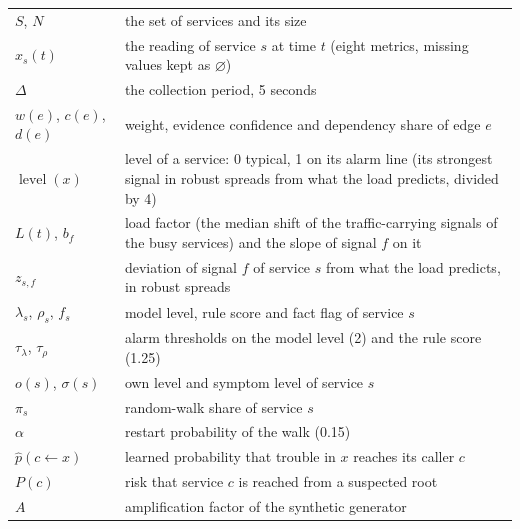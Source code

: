 \begin{tabular}{@{}p{3.2cm}p{11cm}@{}}
$S$, $N$ & the set of services and its size\\
$x_s(t)$ & the reading of service $s$ at time $t$ (eight metrics, missing values kept as $\varnothing$)\\
$\Delta$ & the collection period, 5 seconds\\
$w(e)$, $c(e)$, $d(e)$ & weight, evidence confidence and dependency share of edge $e$\\
$\operatorname{level}(x)$ & level of a service: 0 typical, 1 on its alarm line (its strongest signal in robust spreads from what the load predicts, divided by 4)\\
$L(t)$, $b_f$ & load factor (the median shift of the traffic-carrying signals of the busy services) and the slope of signal $f$ on it\\
$z_{s,f}$ & deviation of signal $f$ of service $s$ from what the load predicts, in robust spreads\\
$\lambda_s$, $\rho_s$, $f_s$ & model level, rule score and fact flag of service $s$\\
$\tau_\lambda$, $\tau_\rho$ & alarm thresholds on the model level (2) and the rule score (1.25)\\
$o(s)$, $\sigma(s)$ & own level and symptom level of service $s$\\
$\pi_s$ & random-walk share of service $s$\\
$\alpha$ & restart probability of the walk (0.15)\\
$\hat p(c \leftarrow x)$ & learned probability that trouble in $x$ reaches its caller $c$\\
$P(c)$ & risk that service $c$ is reached from a suspected root\\
$A$ & amplification factor of the synthetic generator\\
\end{tabular}
